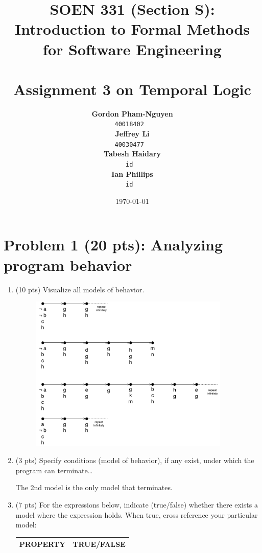 \documentclass[12pt]{article}
\title{SOEN 331 (Section S): Introduction to Formal Methods\\for Software Engineering\\
\ \\
Assignment 3 on Temporal Logic}
\author{\textbf{Gordon Pham-Nguyen}\\
		\texttt{40018402}
\ \\
\textbf{Jeffrey Li}\\
		\texttt{40030477}
\ \\
\textbf{Tabesh Haidary}\\
		\texttt{id}
\ \\
\textbf{Ian Phillips}\\
		\texttt{id}
\ \\
}
\date{\today}
\begin{document}
\maketitle

\newpage

\section*{Problem 1 (20 pts):  Analyzing program behavior}

\begin{enumerate}

\item (10 pts) Visualize all models of behavior.

\begin{figure}[h!]
  \centering
  \includegraphics[width=0.9\textwidth]{figures/1_1.pdf}
 \end{figure}

\item (3 pts) Specify conditions (model of behavior), if any exist, under which the program can terminate\dots

The 2nd model is the only model that terminates.

\item (7 pts) For the expressions below, indicate (true/false) whether there exists a
model where the expression holds. When true, cross reference your particular model:

\begin{table}
\centering
\begin{tabular}{|l|l|}
\hline
\textbf{PROPERTY}							& \textbf{TRUE/FALSE}\\
\hline


\end{tabular}
\end{table}
\end{enumerate}
\end{document}
